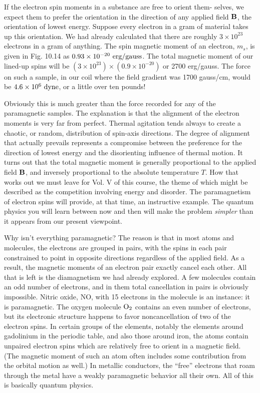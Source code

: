 If the electron spin moments in a substance are free to orient them-
selves, we expect them to prefer the orientation in the direction of
any applied field $\mathbf{B}$, the orientation of lowest energy. Suppose every
electron in a gram of material takes up this orientation. We had
already calculated that there are roughly $3 \times 10^{23}$ electrons in a gram
of anything. The spin magnetic moment of an electron, $m_s$, is given
in Fig. 10.14 as $0.93\times10^{-20}\ \zu{erg}/\zu{gauss}$. The total magnetic moment
of our lined-up spins will be $(3 \times 10^{23}) \times (0.9 \times 10^{-20})$ or 2700
erg/gauss. The force on such a sample, in our coil where the field
gradient was 1700 gauss/cm, would be $4.6 \times 10^{6}\ \textup{dyne}$, or a little
over ten pounds!

Obviously this is much greater than the force recorded for any of
the paramagnetic samples. The explanation is that the alignment
of the electron moments is very far from perfect. Thermal agitation
tends always to create a chaotic, or random, distribution of spin-axis
directions. The degree of alignment that actually prevails represents
a compromise between the preference for the direction of lowest
energy and the disorienting influence of thermal motion. It turns
out that the total magnetic moment is generally proportional to the
applied field $\mathbf{B}$, and inversely proportional to the absolute temperature
$T$. How that works out we must leave for Vol. V of this course,
the theme of which might be described as the competition involving
energy and disorder. The paramagnetism of electron spins will
provide, at that time, an instructive example. The quantum physics
you will learn between now and then will make the problem \emph{simpler}
than it appears from our present viewpoint.

Why isn't everything paramagnetic? The reason is that in most
atoms and molecules, the electrons are grouped in pairs, with the
spins in each pair constrained to point in opposite directions regardless
of the applied field. As a result, the magnetic moments of an
electron pair exactly cancel each other. All that is left is the 
diamagnetism we had already explored. A few molecules contain an odd
number of electrons, and in them total cancellation in pairs is obviously
impossible. Nitric oxide, NO, with 15 electrons in the molecule
is an instance: it is paramagnetic. The oxygen molecule $\textup{O}_2$
contains an even number of electrons, but its electronic structure
happens to favor noncancellation of two of the electron spins. In
certain groups of the elements, notably the elements around gadolinium
in the periodic table, and also those around iron, the atoms
contain unpaired electron spins which are relatively free to orient
in a magnetic field. (The magnetic moment of such an atom often
includes some contribution from the orbital motion as well.) In
metallic conductors, the ``free'' electrons that roam through the metal
have a weakly paramagnetic behavior all their own. All of this is
basically quantum physics.

